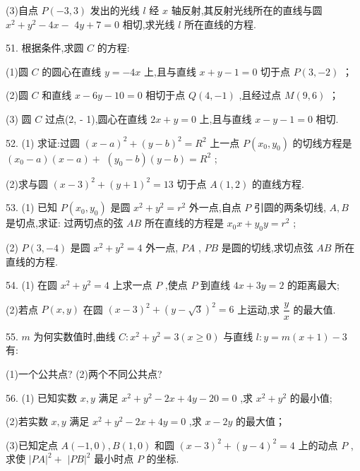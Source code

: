 (3)自点 $P\left( {-3,3}\right)$ 发出的光线 $l$ 经 $x$ 轴反射,其反射光线所在的直线与圆 ${x}^{2} + {y}^{2} - {4x} -$  ${4y} + 7 = 0$ 相切,求光线 $l$ 所在直线的方程.

51. 根据条件,求圆 $C$ 的方程:

(1)圆 $C$ 的圆心在直线 $y =  - {4x}$ 上,且与直线 $x + y - 1 = 0$ 切于点 $P\left( {3, - 2}\right)$ ；

(2)圆 $C$ 和直线 $x - {6y} - {10} = 0$ 相切于点 $Q\left( {4, - 1}\right)$ ,且经过点 $M\left( {9,6}\right)$ ；

(3) 圆 $C$ 过点(2, - 1),圆心在直线 ${2x} + y = 0$ 上,且与直线 $x - y - 1 = 0$ 相切.

52. (1) 求证:过圆 ${\left( x - a\right) }^{2} + {\left( y - b\right) }^{2} = {R}^{2}$ 上一点 $P\left( {{x}_{0},{y}_{0}}\right)$ 的切线方程是 $\left( {{x}_{0} - a}\right) \left( {x - a}\right)  +$  $\left( {{y}_{0} - b}\right) \left( {y - b}\right)  = {R}^{2}$ ;

(2)求与圆 ${\left( x - 3\right) }^{2} + {\left( y + 1\right) }^{2} = {13}$ 切于点 $A\left( {1,2}\right)$ 的直线方程.

53. (1) 已知 $P\left( {{x}_{0},{y}_{0}}\right)$ 是圆 ${x}^{2} + {y}^{2} = {r}^{2}$ 外一点,自点 $P$ 引圆的两条切线, $A,B$ 是切点,求证: 过两切点的弦 ${AB}$ 所在直线的方程是 ${x}_{0}x + {y}_{0}y = {r}^{2}$ ;

(2) $P\left( {3, - 4}\right)$ 是圆 ${x}^{2} + {y}^{2} = 4$ 外一点, ${PA}$ , ${PB}$ 是圆的切线,求切点弦 ${AB}$ 所在直线的方程.

54. (1) 在圆 ${x}^{2} + {y}^{2} = 4$ 上求一点 $P$ ,使点 $P$ 到直线 ${4x} + {3y} = 2$ 的距离最大;

(2)若点 $P\left( {x,y}\right)$ 在圆 ${\left( x - 3\right) }^{2} + {\left( y - \sqrt{3}\right) }^{2} = 6$ 上运动,求 $\dfrac{y}{x}$ 的最大值.

55. $m$ 为何实数值时,曲线 $C : {x}^{2} + {y}^{2} = 3\left( {x \geq  0}\right)$ 与直线 $l : y = m\left( {x + 1}\right)  - 3$ 有:

(1)一个公共点? (2)两个不同公共点?

56. (1) 已知实数 $x,y$ 满足 ${x}^{2} + {y}^{2} - {2x} + {4y} - {20} = 0$ ,求 ${x}^{2} + {y}^{2}$ 的最小值;

(2)若实数 $x,y$ 满足 ${x}^{2} + {y}^{2} - {2x} + {4y} = 0$ ,求 $x - {2y}$ 的最大值；

(3)已知定点 $A\left( {-1,0}\right) ,B\left( {1,0}\right)$ 和圆 ${\left( x - 3\right) }^{2} + {\left( y - 4\right) }^{2} = 4$ 上的动点 $P$ ,求使 ${\left| PA\right| }^{2} +$  ${\left| PB\right| }^{2}$ 最小时点 $P$ 的坐标.

